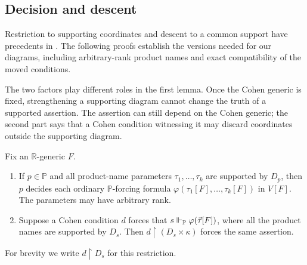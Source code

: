 \subsection{Decision and descent}

Restriction to supporting coordinates and descent to a common support
have precedents in \cite[Lemmas~10 and~15]{HolySchilhan2025}.
The following proofs establish the versions needed for our diagrams,
including arbitrary-rank product names and exact compatibility of the
moved conditions.

The two factors play different roles in the first lemma.  Once the
Cohen generic is fixed, strengthening a supporting diagram cannot change
the truth of a supported assertion.  The assertion can still depend on
the Cohen generic; the second part says that a Cohen condition witnessing
it may discard coordinates outside the supporting diagram.

\begin{lemma}
\label{lem:local-decision}
Fix an \(\mathbb R\)-generic \(F\).
\begin{enumerate}
\item
If \(p\in\mathbb P\) and all product-name parameters
\(\tau_1,\ldots,\tau_k\) are supported by \(D_p\), then \(p\)
decides each ordinary \(\mathbb P\)-forcing formula
\(\varphi(\tau_1[F],\ldots,\tau_k[F])\) in \(V[F]\).
The parameters may have arbitrary rank.
\item
Suppose a Cohen condition \(d\) forces that
\(s\Vdash_{\mathbb P}\varphi(\vec\tau[F])\), where all the
product names are supported by \(D_s\).
Then \(d\restriction(D_s\times\kappa)\) forces the same assertion.
\end{enumerate}
For brevity we write \(d\restriction D_s\) for this restriction.
\end{lemma}

